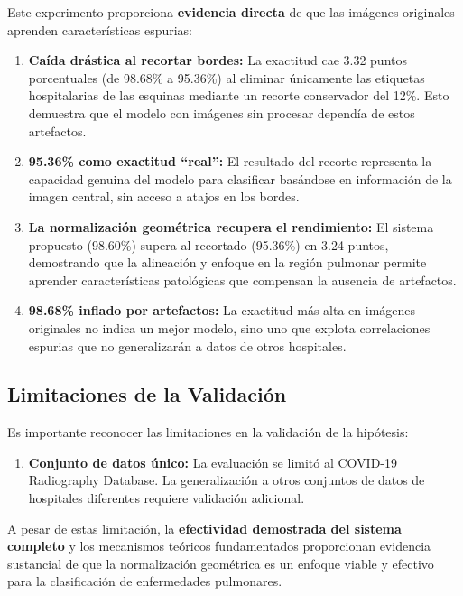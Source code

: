 Este experimento proporciona \textbf{evidencia directa} de que las imágenes originales aprenden características espurias:

\begin{enumerate}
    \item \textbf{Caída drástica al recortar bordes:} La exactitud cae 3.32 puntos porcentuales (de 98.68\% a 95.36\%) al eliminar únicamente las etiquetas hospitalarias de las esquinas mediante un recorte conservador del 12\%. Esto demuestra que el modelo con imágenes sin procesar dependía de estos artefactos.

    \item \textbf{95.36\% como exactitud ``real'':} El resultado del recorte representa la capacidad genuina del modelo para clasificar basándose en información de la imagen central, sin acceso a atajos en los bordes.

    \item \textbf{La normalización geométrica recupera el rendimiento:} El sistema propuesto (98.60\%) supera al recortado (95.36\%) en 3.24 puntos, demostrando que la alineación y enfoque en la región pulmonar permite aprender características patológicas que compensan la ausencia de artefactos.

    \item \textbf{98.68\% inflado por artefactos:} La exactitud más alta en imágenes originales no indica un mejor modelo, sino uno que explota correlaciones espurias que no generalizarán a datos de otros hospitales.
\end{enumerate}

\subsection{Limitaciones de la Validación}
\label{subsec:limitaciones_validacion}

Es importante reconocer las limitaciones en la validación de la hipótesis:

\begin{enumerate}
    \item \textbf{Conjunto de datos único:} La evaluación se limitó al COVID-19 Radiography Database. La generalización a otros conjuntos de datos de hospitales diferentes requiere validación adicional.

\end{enumerate}

A pesar de estas limitación, la \textbf{efectividad demostrada del sistema completo} y los mecanismos teóricos fundamentados proporcionan evidencia sustancial de que la normalización geométrica es un enfoque viable y efectivo para la clasificación de enfermedades pulmonares.

